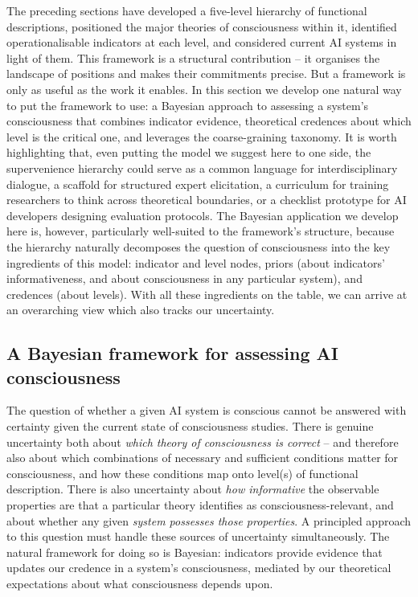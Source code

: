 \documentclass[11pt, a4paper, onecolumn, gdm]{google}
\begin{document}
The preceding sections have developed a five-level hierarchy of functional descriptions, positioned the major theories of consciousness within it, identified operationalisable indicators at each level, and considered current AI systems in light of them.
This framework is a structural contribution -- it organises the landscape of positions and makes their commitments precise.
But a framework is only as useful as the work it enables.
In this section we develop one natural way to put the framework to use: a Bayesian approach to assessing a system's consciousness that combines indicator evidence, theoretical credences about which level is the critical one, and leverages the coarse-graining taxonomy.
It is worth highlighting that, even putting the model we suggest here to one side, the supervenience hierarchy could serve as a common language for interdisciplinary dialogue, a scaffold for structured expert elicitation, a curriculum for training researchers to think across theoretical boundaries, or a checklist prototype for AI developers designing evaluation protocols.
The Bayesian application we develop here is, however, particularly well-suited to the framework's structure, because the hierarchy naturally decomposes the question of consciousness into the key ingredients of this model: indicator and level nodes, priors (about indicators' informativeness, and about consciousness in any particular system), and credences (about levels).
With all these ingredients on the table, we can arrive at an overarching view which also tracks our uncertainty.

\subsection{A Bayesian framework for assessing AI consciousness}\label{a-bayesian-framework-for-assessing-ai-consciousness}

The question of whether a given AI system is conscious cannot be answered with certainty given the current state of consciousness studies.
There is genuine uncertainty both about \emph{which theory of consciousness is correct} -- and therefore also about which combinations of necessary and sufficient conditions matter for consciousness, and how these conditions map onto level(s) of functional description. There is also uncertainty about \emph{how informative} the observable properties are that a particular theory identifies as consciousness-relevant, and about whether any given \emph{system possesses those properties}.
A principled approach to this question must handle these sources of uncertainty simultaneously.
The natural framework for doing so is Bayesian: indicators provide evidence that updates our credence in a system's consciousness, mediated by our theoretical expectations about what consciousness depends upon.
\end{document}
